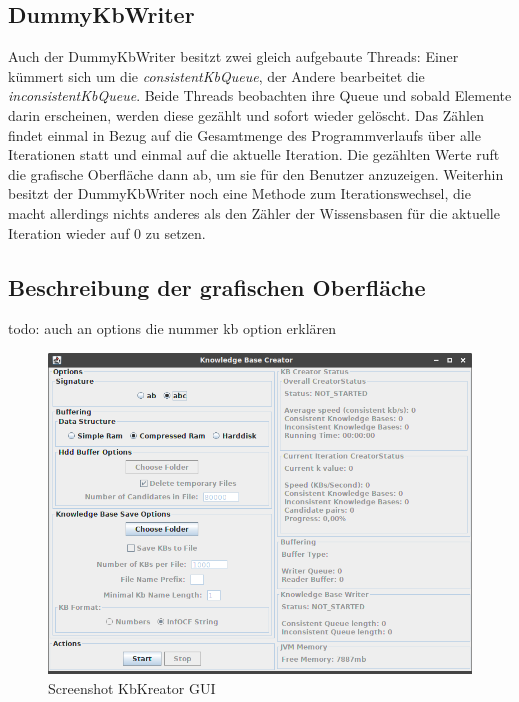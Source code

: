 \documentclass[12pt,a4paper]{article}
\begin{document}
\subsection{DummyKbWriter}
\label{sec:dummywriter}
Auch der DummyKbWriter besitzt zwei gleich aufgebaute Threads: Einer kümmert sich um die \textit{consistentKbQueue}, der Andere bearbeitet die \textit{inconsistentKbQueue}. Beide Threads beobachten ihre Queue und sobald Elemente darin erscheinen, werden diese gezählt und sofort wieder gelöscht. Das Zählen findet einmal  in Bezug auf die Gesamtmenge des Programmverlaufs über alle Iterationen statt und einmal auf die aktuelle Iteration. Die gezählten Werte ruft die grafische Oberfläche dann ab, um sie für den Benutzer anzuzeigen. Weiterhin besitzt der DummyKbWriter noch eine Methode zum Iterationswechsel, die macht allerdings nichts anderes als den Zähler der Wissensbasen für die aktuelle Iteration wieder auf 0 zu setzen.


\subsection{Beschreibung der grafischen Oberfläche}
todo: auch an options die nummer kb option erklären

\begin{figure}
\includegraphics[width=0.97\linewidth]{bilder/KbCreator_gesamt.png}
\caption{Screenshot KbKreator GUI}
\label{pic:kbcreator_gesamt}
\end{figure}
\end{document}
